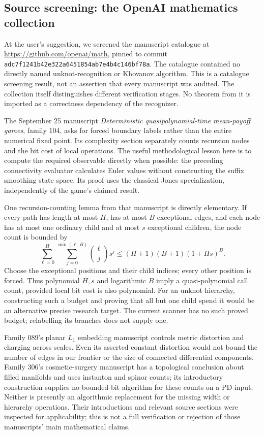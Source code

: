 \subsection{Source screening: the OpenAI mathematics collection}
At the user's suggestion, we screened the manuscript catalogue at
\url{https://github.com/openai/math}, pinned to commit
\texttt{adc7f1241b42e322a6451854ab7e4b4c146bf78a}.
The catalogue contained no directly named unknot-recognition or Khovanov
algorithm. This is a catalogue screening result, not an assertion that
every manuscript was audited. The collection itself distinguishes
different verification stages. No theorem from it is imported as a
correctness dependency of the recognizer.

The September 25 manuscript \emph{Deterministic quasipolynomial-time
mean-payoff games}, family 104, asks for forced boundary labels rather
than the entire numerical fixed point. Its complexity section separately
counts recursion nodes and the bit cost of local operations. The useful
methodological lesson here is to compute the required observable directly
when possible: the preceding connectivity evaluator calculates Euler
values without constructing the suffix smoothing state space. Its proof
uses the classical Jones specialization, independently of the game's
claimed result.

One recursion-counting lemma from that manuscript is directly elementary.
If every path has length at most $H$, has at most $B$ exceptional edges,
and each node has at most one ordinary child and at most $s$ exceptional
children, the node count is bounded by
\[
 \sum_{\ell=0}^{H}\sum_{j=0}^{\min(\ell,B)}
       {\ell\choose j}s^j
 \le (H+1)(B+1)(1+Hs)^B.
\]
Choose the exceptional positions and their child indices; every other
position is forced. Thus polynomial $H,s$ and logarithmic $B$ imply a
quasi-polynomial call count, provided local bit cost is also polynomial.
For an unknot hierarchy, constructing such a budget and proving that all
but one child spend it would be an alternative precise research target.
The current scanner has no such proved budget; relabelling its branches
does not supply one.

Family 089's planar $L_1$ embedding manuscript controls metric distortion
and charging across scales. Even its asserted constant distortion would
not bound the number of edges in our frontier or the size of connected
differential components. Family 306's cosmetic-surgery manuscript has a
topological conclusion about filled manifolds and uses instanton and
spinor counts; its introductory construction supplies no bounded-bit
algorithm for these counts on a PD input. Neither is presently an
algorithmic replacement for the missing width or hierarchy operations.
Their introductions and relevant source sections were inspected for
applicability; this is not a full verification or rejection of those
manuscripts' main mathematical claims.
